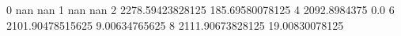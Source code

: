 0 nan nan
1 nan nan
2 2278.59423828125 185.69580078125
4 2092.8984375 0.0
6 2101.90478515625 9.00634765625
8 2111.90673828125 19.00830078125
